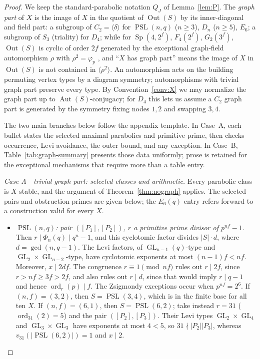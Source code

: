 \documentclass[11pt]{amsart}
\theoremstyle{definition}
\theoremstyle{remark}
\DeclareMathOperator{\Aut}{Aut}
\DeclareMathOperator{\Out}{Out}
\DeclareMathOperator{\PSL}{PSL}
\DeclareMathOperator{\Sp}{Sp}
\DeclareMathOperator{\GL}{GL}
\DeclareMathOperator{\ord}{ord}
\newcommand{\vp}[1]{v_{#1}}
\begin{document}
\begin{proof}
We keep the standard-parabolic notation $Q_J$ of Lemma~\ref{lem:P}. The
\emph{graph part} of $X$ is the image of $X$ in the quotient of
$\Out(S)$ by its inner-diagonal and field part: a subgroup of
$C_2=\langle\delta\rangle$ for $\PSL(n,q)$ ($n\geq3$), $D_n$ ($n\geq5$),
$E_6$; a subgroup of $S_3$ (triality) for $D_4$; while for $\Sp(4,2^f)$,
$F_4(2^f)$, $G_2(3^f)$, $\Out(S)$ is cyclic of order $2f$ generated by
the exceptional graph-field automorphism $\rho$ with $\rho^2=\varphi_p$
\cite[Def.~3.1(b), p.~31, and Thm.~3.4, p.~32]{BrotoMollerOliver2019},
and ``$X$ has graph part'' means the image of
$X$ in $\Out(S)$ is not contained in $\langle\rho^2\rangle$. An
automorphism acts on the building permuting vertex types by a diagram
symmetry; automorphisms with trivial graph part preserve every type. By
Convention~\ref{conv:X} we may normalize the graph part up to
$\Aut(S)$-conjugacy; for $D_4$ this lets us assume a $C_2$ graph part is
generated by the symmetry fixing nodes $1,2$ and swapping $3,4$.

The two main branches below follow the appendix template. In Case~A, each
bullet states the selected maximal parabolics and primitive prime, then checks
occurrence, Levi avoidance, the outer bound, and any exception. In Case~B,
Table~\ref{tab:graph-summary} presents those data uniformly; prose is retained
for the exceptional mechanisms that require more than a table entry.

\emph{Case A---trivial graph part: selected classes and arithmetic.}
Every parabolic class is
$X$-stable, and the argument of Theorem~\ref{thm:nograph} applies. The selected
pairs and obstruction primes are given below; the $E_6(q)$ entry refers forward
to a construction valid for every $X$.
\begin{itemize}
\item \emph{$\PSL(n,q)$: pair $([P_1],[P_2])$, $r$ a primitive prime divisor
of $p^{nf}-1$.} Then $r\mid\Phi_n(q)\mid q^n-1$, and this cyclotomic
factor divides $|S|\cdot d$, where $d=\gcd(n,q-1)$. The Levi factors,
of $\GL_{n-1}(q)$-type and $\GL_2{\times}\GL_{n-2}$-type, have
cyclotomic exponents at most $(n-1)f<nf$. Moreover, $x\mid2df$. The
congruence $r\equiv1\pmod{nf}$ rules out $r\mid2f$, since
$r>nf\geq3f>2f$, and also rules out $r\mid d$, since that would imply
$r\mid q-1$ and hence $\ord_r(p)\mid f$. The Zsigmondy exceptions occur
when $p^{nf}=2^6$. If $(n,f)=(3,2)$, then $S=\PSL(3,4)$, which is in the
finite base for all ten $X$. If $(n,f)=(6,1)$, then $S=\PSL(6,2)$;
take instead $r=31$ ($\ord_{31}(2)=5$) and the pair
$([P_2],[P_3])$. Their Levi types $\GL_2{\times}\GL_4$ and
$\GL_3{\times}\GL_3$ have exponents at most $4<5$, so
$31\nmid|P_2||P_3|$, whereas $\vp{31}(|\PSL(6,2)|)=1$ and $x\mid2$.


\end{itemize}
\end{proof}
\end{document}
